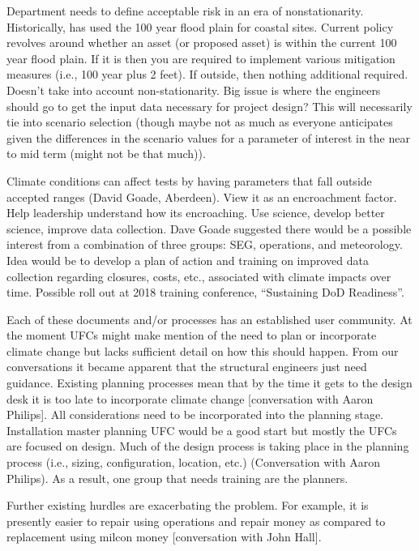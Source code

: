 \documentclass[10pt]{amsart}
\begin{document}
Department needs to define acceptable risk in an era of nonstationarity.
Historically, has used the 100 year flood plain for coastal sites.
Current policy revolves around whether an asset (or proposed asset) is within the current 100 year flood plain.
If it is then you are required to implement various mitigation measures (i.e., 100 year plus 2 feet). 
If outside, then nothing additional required.
Doesn't take into account non-stationarity.
Big issue is where the engineers should go to get the input data necessary for project design?
This will necessarily tie into scenario selection (though maybe not as much as everyone anticipates given the differences in the scenario values for a parameter of interest in the near to mid term (might not be that much)). 


Climate conditions can affect tests by having parameters that fall outside accepted ranges \parencite{}(David Goade, Aberdeen).
View it as an encroachment factor. 
Help leadership understand how its encroaching. 
Use science, develop better science, improve data collection. 
Dave Goade suggested there would be a possible interest from a combination of three groups: SEG, operations, and meteorology. Idea would be to develop a plan of action and training on improved data collection regarding closures, costs, etc., associated with climate impacts over time. Possible roll out at 2018 training conference, “Sustaining DoD Readiness”. 

Each of these documents and/or processes has an established user community.
At the moment UFCs might make mention of the need to plan or incorporate climate change but lacks sufficient detail on how this should happen.
From our conversations it became apparent that the structural engineers just need guidance. 
Existing planning processes mean that by the time it gets to the design desk it is too late to incorporate climate change \parencite{}[conversation with Aaron Philips].
All considerations need to be incorporated into the planning stage. 
Installation master planning UFC would be a good start but mostly the UFCs are focused on design.
Much of the design process is taking place in the planning process (i.e., sizing, configuration, location, etc.) \parencite{}(Conversation with Aaron Philips).
As a result, one group that needs training are the planners. 
 
Further existing hurdles are exacerbating the problem.
For example, it is presently easier to repair using operations and repair money as compared to replacement using milcon money \parencite{}[conversation with John Hall].
\end{document}

